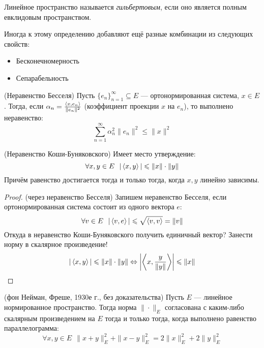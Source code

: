 \begin{definition}
	Линейное пространство называется \textit{гильбертовым}, если оно является полным евклидовым пространством.
\end{definition}

\begin{note}
	Иногда к этому определению добавляют ещё разные комбинации из следующих свойств:
	\begin{itemize}
		\item Бесконечномерность
		
		\item Сепарабельность
	\end{itemize}
\end{note}

\begin{reminder} (Неравенство Бесселя)
	Пусть $\{e_n\}_{n = 1}^\infty \subseteq E$ --- ортонормированная система, $x \in E$. Тогда, если $\alpha_n = \frac{\left\langle x, e_n\right\rangle}{\|e_n\|^2}$ (коэффициент проекции $x$ на $e_n$), то выполнено неравенство:
	\[
		\sum_{n = 1}^\infty \alpha_n^2\|e_n\|^2 \le \|x\|^2
	\]
\end{reminder}

\begin{proposition} (Неравенство Коши-Буняковского)
	Имеет место утверждение:
	\[
		\forall x, y \in E\ \ |\left\langle x, y\right\rangle| \leqslant \|x\| \cdot \|y\|
	\]
	Причём равенство достигается тогда и только тогда, когда $x, y$ линейно зависимы.
\end{proposition}

\begin{proof} (через неравенство Бесселя)
	Запишем неравенство Бесселя, если ортонормированная система состоит из одного вектора $e$:
	\[
		\forall v \in E\ \ |\left\langle v, e\right\rangle| \leqslant \sqrt{\left\langle v, v\right\rangle} = \|v\|
	\]
	Откуда в неравенство Коши-Буняковского получить единичный вектор? Занести норму в скалярное произведение!
	\[
		|\left\langle x, y\right\rangle| \leqslant \|x\| \cdot \|y\| \Leftrightarrow \left|\left\langle x, \frac{y}{\|y\|}\right\rangle\right| \leqslant \|x\|
	\]
\end{proof}

\begin{theorem} (фон Нейман, Фреше, 1930е г., без доказательства)
	Пусть $E$ --- линейное нормированное пространство. Тогда норма $\|\cdot\|_E$ согласована с каким-либо скалярным произведением на $E$ тогда и только тогда, когда выполнено равенство параллелограмма:
	\[
		\forall x, y \in E\ \ \|x + y\|_E^2 + \|x - y\|_E^2 = 2\|x\|_E^2 + 2\|y\|_E^2
	\]
\end{theorem}

